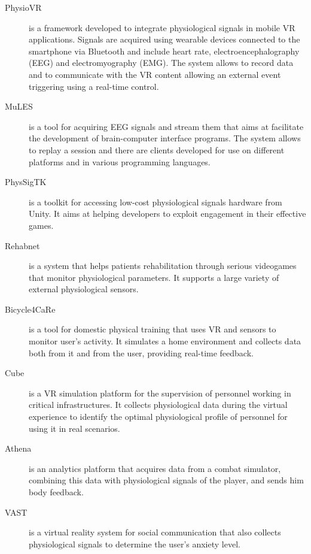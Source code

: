 \documentclass[binding=0.6cm,LaM]{sapthesis}
\begin{document}
\begin{description}

\item [PhysioVR] \cite{munoz2016physiovr} is a framework developed to integrate physiological signals in mobile VR applications. Signals are acquired using wearable devices connected to the smartphone via Bluetooth and include heart rate, electroencephalography (EEG) and electromyography (EMG). The system allows to record data and to communicate with the VR content allowing an external event triggering using a real-time control.

\item [MuLES] \cite{cassani2015mules} is a tool for acquiring EEG signals and stream them that aims at facilitate the development of brain-computer interface programs. The system allows to replay a session and there are clients developed for use on different platforms and in various programming languages.

\item [PhysSigTK] \cite{rank2015physsigtk} is a toolkit for accessing low-cost physiological signals hardware from Unity. It aims at helping developers to exploit engagement in their effective games. 

\item [Rehabnet] \cite{vourvopoulos2013rehabnet} is a system that helps patients rehabilitation through serious videogames that monitor physiological parameters. It supports a large variety of external physiological sensors. 

\item [Bicycle4CaRe] \cite{baldassini2017customization} is a tool for domestic physical training that uses VR and sensors to monitor user's activity. It simulates a home environment and collects data both from it and from the user, providing real-time feedback.

\item [Cube] \cite{cepisca2015platform} is a VR simulation platform for the supervision of personnel working in critical infrastructures. It collects physiological data during the virtual experience to identify the optimal physiological profile of personnel for using it in real scenarios.

\item [Athena] \cite{mcgregor2017integrating} is an analytics platform that acquires data from a combat simulator, combining this data with physiological signals of the player, and sends him body feedback.

\item [VAST] \cite{kuriakose2015understanding} is a virtual reality system for social communication that also collects physiological signals to determine the user's anxiety level.

\end{description}
\end{document}
